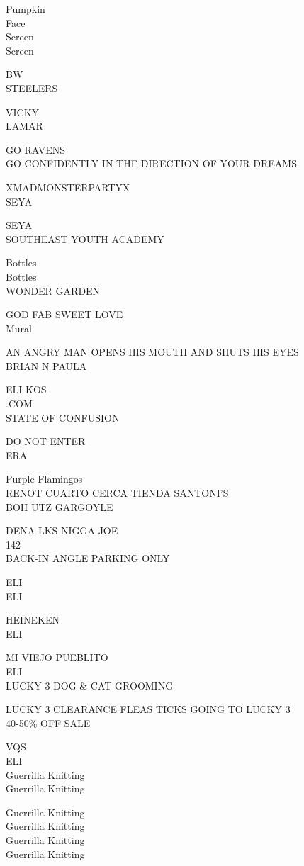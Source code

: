 \documentclass[10pt,letterpaper]{article}
\begin{document}
Pumpkin\\
Face\\
Screen\\
Screen

BW\\
STEELERS

VICKY\\
LAMAR

GO RAVENS\\
GO CONFIDENTLY IN THE DIRECTION OF YOUR DREAMS

XMADMONSTERPARTYX\\
SEYA

SEYA\\
SOUTHEAST YOUTH ACADEMY

Bottles\\
Bottles\\
WONDER GARDEN

GOD FAB SWEET LOVE\\
Mural

AN ANGRY MAN OPENS HIS MOUTH AND SHUTS HIS EYES\\
BRIAN N PAULA

ELI KOS\\
.COM\\
STATE OF CONFUSION

DO NOT ENTER\\
ERA

Purple Flamingos\\
RENOT CUARTO CERCA TIENDA SANTONI'S\\
BOH UTZ GARGOYLE

DENA LKS NIGGA JOE\\
142\\
BACK{-}IN ANGLE PARKING ONLY

ELI\\
ELI

HEINEKEN\\
ELI

MI VIEJO PUEBLITO\\
ELI\\
LUCKY 3 DOG \& CAT GROOMING

LUCKY 3 CLEARANCE FLEAS TICKS GOING TO LUCKY 3\\
40{-}50\% OFF SALE

VQS\\
ELI\\
Guerrilla Knitting\\
Guerrilla Knitting

Guerrilla Knitting\\
Guerrilla Knitting\\
Guerrilla Knitting\\
Guerrilla Knitting
\end{document}
